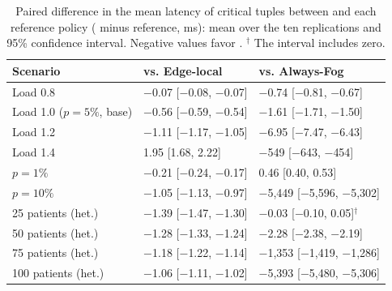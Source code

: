 \begin{table}[H]
\caption{Paired difference in the mean latency of critical tuples between \policy{} and each reference policy (\policy{} minus reference, ms): mean over the ten replications and 95\% confidence interval. Negative values favor \policy{}. $^{\dagger}$ The interval includes zero.\label{tab:paired}}
\small
{}
\begin{tabularx}{\textwidth}{lCC}
\toprule
\textbf{Scenario} & \textbf{vs. Edge-local} & \textbf{vs. Always-Fog} \\
\midrule
Load 0.8 & $-$0.07 [$-$0.08, $-$0.07] & $-$0.74 [$-$0.81, $-$0.67] \\
Load 1.0 ($p=5\%$, base) & $-$0.56 [$-$0.59, $-$0.54] & $-$1.61 [$-$1.71, $-$1.50] \\
Load 1.2 & $-$1.11 [$-$1.17, $-$1.05] & $-$6.95 [$-$7.47, $-$6.43] \\
Load 1.4 & 1.95 [1.68, 2.22] & $-$549 [$-$643, $-$454] \\
$p=1\%$ & $-$0.21 [$-$0.24, $-$0.17] & 0.46 [0.40, 0.53] \\
$p=10\%$ & $-$1.05 [$-$1.13, $-$0.97] & $-$5,449 [$-$5,596, $-$5,302] \\
25 patients (het.) & $-$1.39 [$-$1.47, $-$1.30] & $-$0.03 [$-$0.10, 0.05]$^{\dagger}$ \\
50 patients (het.) & $-$1.28 [$-$1.33, $-$1.24] & $-$2.28 [$-$2.38, $-$2.19] \\
75 patients (het.) & $-$1.18 [$-$1.22, $-$1.14] & $-$1,353 [$-$1,419, $-$1,286] \\
100 patients (het.) & $-$1.06 [$-$1.11, $-$1.02] & $-$5,393 [$-$5,480, $-$5,306] \\
\bottomrule
\end{tabularx}
\end{table}
